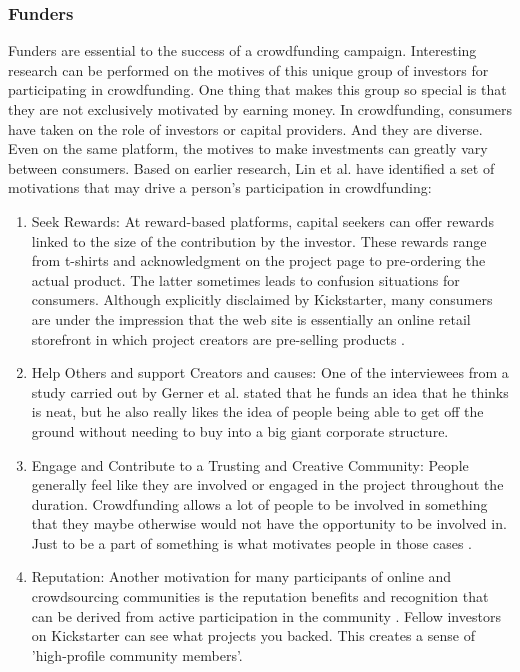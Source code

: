 \subsubsection*{Funders}
Funders are essential to the success of a crowdfunding campaign. Interesting research can be performed on the motives of this unique group of investors for participating in crowdfunding. One thing that
makes this group so special is that they are not exclusively motivated by earning money.
In crowdfunding, consumers have taken on the role of investors or capital providers. And they are diverse. Even on the same platform, the motives to make investments can greatly vary between consumers.
Based on earlier research, Lin et al. \cite{doi:10.5465/ambpp.2014.209} have identified a set of motivations that may drive a person’s participation in crowdfunding:

\begin{enumerate}
      \item Seek Rewards:
            At reward-based platforms, capital seekers can offer rewards linked to the size of the contribution by the investor. These rewards range from t-shirts and
            acknowledgment on the project page to pre-ordering the actual product. The latter sometimes leads
            to confusion situations for consumers. Although explicitly disclaimed by Kickstarter, many consumers
            are under the impression that the web site is essentially an online retail storefront in which project
            creators are pre-selling products \cite{10.2139/ssrn.2234765}.

      \item Help Others and support Creators and causes: One of the interviewees from a study carried out by Gerner et al. \cite{inproceedings}
            stated that he funds an idea that he thinks is neat, but he also really likes the idea of people being
            able to get off the ground without needing to buy into a big giant corporate structure.

      \item Engage and Contribute to a Trusting and Creative Community:
            People generally feel like they are involved or engaged in the project
            throughout the duration. Crowdfunding allows a lot of people to be involved in something that
            they maybe otherwise would not have the opportunity to be involved in. Just to be a part of something
            is what motivates people in those cases \cite{inproceedings}.

      \item Reputation:
            Another motivation for many participants of online and crowdsourcing communities is
            the reputation benefits and recognition that can be derived from active participation in the community \cite{doi:10.5465/ambpp.2014.209}.
            Fellow investors on Kickstarter can see what projects you backed. This creates a sense of ’high-profile
            community members’.
\end{enumerate}


